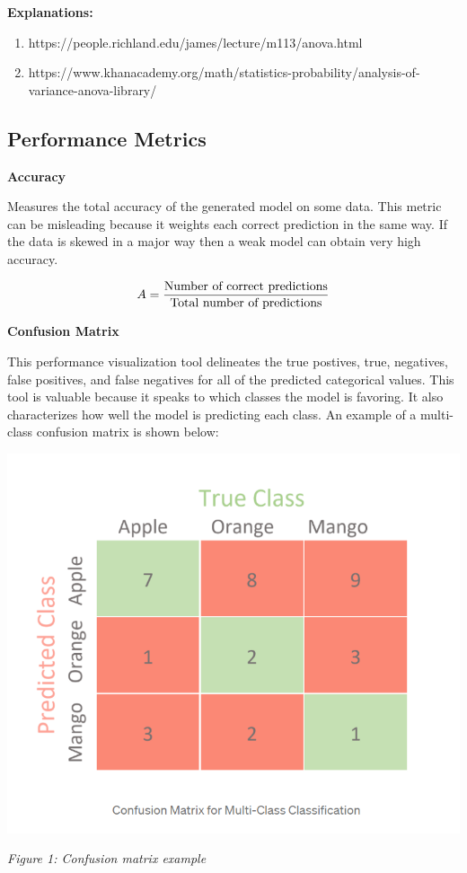 \documentclass{article}
\begin{document}
\vspace{3mm}
\textbf{Explanations:}
\begin{enumerate}
\item https://people.richland.edu/james/lecture/m113/anova.html
\item https://www.khanacademy.org/math/statistics-probability/analysis-of-variance-anova-library/
\end{enumerate}

\subsection{Performance Metrics}
\vspace{3mm}
\noindent
\textbf{Accuracy}

\vspace{3mm}
\noindent
Measures the total accuracy of the generated model on some data. This metric can be misleading because it weights each correct prediction in the same way. If the data is skewed in a major way then a weak model can obtain very high accuracy.

\[A = \frac{\textnormal{Number of correct predictions}}{\textnormal{Total number of predictions}}\]

\vspace{3mm}
\noindent
\textbf{Confusion Matrix}

\vspace{3mm}
\noindent
This performance visualization tool delineates the true postives, true, negatives, false positives, and false negatives for all of the predicted categorical values. This tool is valuable because it speaks to which classes the model is favoring. It also characterizes how well the model is predicting each class. An example of a multi-class confusion matrix is shown below:

\vspace{-2mm}
\begin{center}
\includegraphics{confusion_matrix.png}

\textit{Figure 1: Confusion matrix example}
\end{center}
\end{document}
